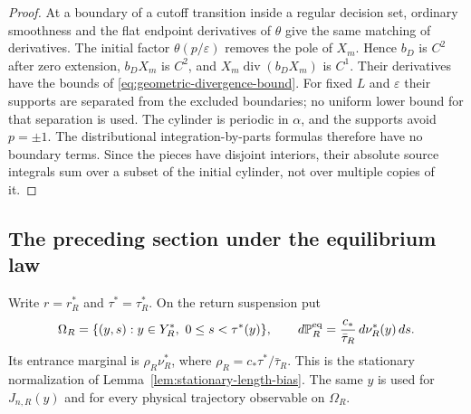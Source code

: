 \begin{proof}
At a boundary of a cutoff transition inside a regular decision set,
ordinary smoothness and the flat endpoint derivatives of $\theta$
give the same matching of derivatives. The initial factor
$\theta(p/\varepsilon)$ removes the pole of $X_m$. Hence $b_D$ is
$C^2$ after zero extension, $b_DX_m$ is $C^2$, and
$X_m\operatorname{div}(b_DX_m)$ is $C^1$. Their derivatives have the
bounds of \eqref{eq:geometric-divergence-bound}. For fixed $L$ and
$\varepsilon$ their supports are separated from the excluded boundaries;
no uniform lower bound for that separation is used. The cylinder is
periodic in $\alpha$, and the supports avoid $p=\pm1$.
The distributional integration-by-parts formulas therefore have no
boundary terms. Since the pieces have disjoint interiors, their
absolute source integrals sum over a subset of the initial cylinder,
not over multiple copies of it.
\end{proof}

\subsection{The preceding section under the equilibrium law}
Write $r=r_R^*$ and $\tau^*=\tau_R^*$. On the return suspension put
\begin{equation}\label{eq:equilibrium-source-for-inversion}
 \Omega_R=\{(y,s):y\in Y_R^*,\ 0\le s<\tau^*(y)\},\qquad
 d\mathbb P_R^{\rm eq}=\frac{c_*}{\bar\tau_R}\,d\nu_R^*(y)\,ds.
\end{equation}
Its entrance marginal is $\rho_R\nu_R^*$, where
$\rho_R=c_*\tau^*/\bar\tau_R$. This is the stationary normalization
of Lemma~\ref{lem:stationary-length-bias}. The same $y$ is used for
$J_{n,R}(y)$ and for every physical trajectory observable on $\Omega_R$.

